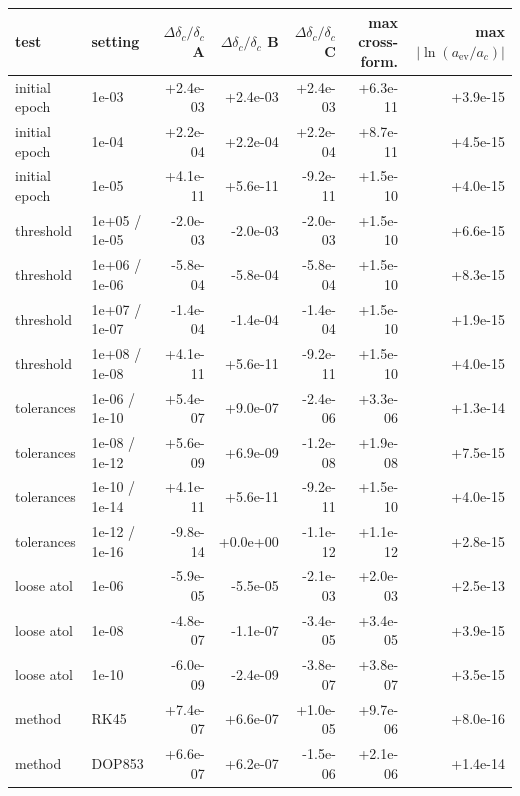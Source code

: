 \begin{tabular}{llrrrrr}
\toprule
test & setting & $\Delta\delta_c/\delta_c$ A & $\Delta\delta_c/\delta_c$ B & $\Delta\delta_c/\delta_c$ C & max cross-form. & max $|\ln(a_\mathrm{ev}/a_c)|$ \\
\midrule
initial epoch & 1e-03 & +2.4e-03 & +2.4e-03 & +2.4e-03 & +6.3e-11 & +3.9e-15 \\
initial epoch & 1e-04 & +2.2e-04 & +2.2e-04 & +2.2e-04 & +8.7e-11 & +4.5e-15 \\
initial epoch & 1e-05 & +4.1e-11 & +5.6e-11 & -9.2e-11 & +1.5e-10 & +4.0e-15 \\
threshold & 1e+05 / 1e-05 & -2.0e-03 & -2.0e-03 & -2.0e-03 & +1.5e-10 & +6.6e-15 \\
threshold & 1e+06 / 1e-06 & -5.8e-04 & -5.8e-04 & -5.8e-04 & +1.5e-10 & +8.3e-15 \\
threshold & 1e+07 / 1e-07 & -1.4e-04 & -1.4e-04 & -1.4e-04 & +1.5e-10 & +1.9e-15 \\
threshold & 1e+08 / 1e-08 & +4.1e-11 & +5.6e-11 & -9.2e-11 & +1.5e-10 & +4.0e-15 \\
tolerances & 1e-06 / 1e-10 & +5.4e-07 & +9.0e-07 & -2.4e-06 & +3.3e-06 & +1.3e-14 \\
tolerances & 1e-08 / 1e-12 & +5.6e-09 & +6.9e-09 & -1.2e-08 & +1.9e-08 & +7.5e-15 \\
tolerances & 1e-10 / 1e-14 & +4.1e-11 & +5.6e-11 & -9.2e-11 & +1.5e-10 & +4.0e-15 \\
tolerances & 1e-12 / 1e-16 & -9.8e-14 & +0.0e+00 & -1.1e-12 & +1.1e-12 & +2.8e-15 \\
loose atol & 1e-06 & -5.9e-05 & -5.5e-05 & -2.1e-03 & +2.0e-03 & +2.5e-13 \\
loose atol & 1e-08 & -4.8e-07 & -1.1e-07 & -3.4e-05 & +3.4e-05 & +3.9e-15 \\
loose atol & 1e-10 & -6.0e-09 & -2.4e-09 & -3.8e-07 & +3.8e-07 & +3.5e-15 \\
method & RK45 & +7.4e-07 & +6.6e-07 & +1.0e-05 & +9.7e-06 & +8.0e-16 \\
method & DOP853 & +6.6e-07 & +6.2e-07 & -1.5e-06 & +2.1e-06 & +1.4e-14 \\
\bottomrule
\end{tabular}
